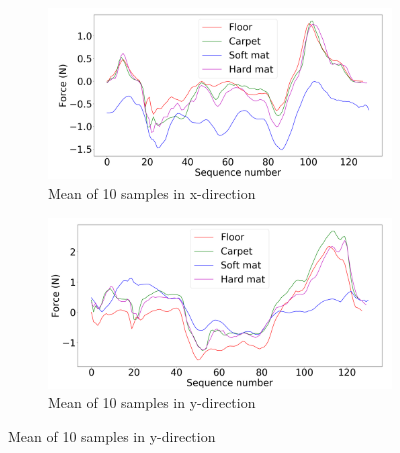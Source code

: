 \documentclass[USenglish]{ifimaster}  %
\begin{document}
\begin{figure} [h]
	\centering
	\begin{subfigure}[b]{0.95\textwidth}
		\includegraphics[width=\textwidth,height=\textheight,keepaspectratio]{Figures/x}
		\caption{Mean of 10 samples in x-direction}
		\label{fig:meanx} 
	\end{subfigure}
	
	\begin{subfigure}[b]{0.95\textwidth}
		\includegraphics[width=\textwidth,height=\textheight,keepaspectratio]{Figures/y}
		\caption{Mean of 10 samples in y-direction}
		\label{fig:meany}
	\end{subfigure}
\end{figure}
\end{document}
